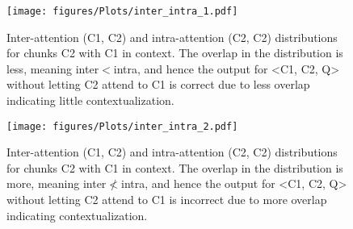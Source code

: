 \begin{figure}[t]
    \centering
    \begin{minipage}[t]{1.0\linewidth}
        \centering
        \texttt{[image: figures/Plots/inter\_intra\_1.pdf]}
        \caption{Inter-attention (C1, C2) and intra-attention (C2, C2) distributions for chunks C2 with C1 in context. The overlap in the distribution is less, meaning inter$<$intra, and hence the output for <C1, C2, Q> without letting C2 attend to C1 is correct due to less overlap indicating little contextualization.}
        \label{fig:tasks_quality_eval_}
    \end{minipage}
\end{figure}


\begin{figure}[t]
    \centering
    \begin{minipage}[t]{1.0\linewidth}
        \centering
        \texttt{[image: figures/Plots/inter\_intra\_2.pdf]}
        \caption{Inter-attention (C1, C2) and intra-attention (C2, C2) distributions for chunks C2 with C1 in context. The overlap in the distribution is more, meaning inter$\nless$intra, and hence the output for <C1, C2, Q> without letting C2 attend to C1 is incorrect due to more overlap indicating contextualization.}
        \label{fig:tasks_quality_eval2}
    \end{minipage}
\end{figure}

